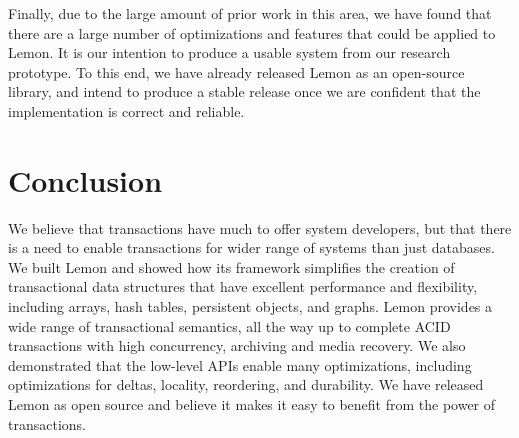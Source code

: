 \documentclass[10pt,letterpaper,twocolumn,english]{article}
\newcommand{\yad}{Lemon\xspace}
\begin{document}


Finally, due to the large amount of prior work in this area, we have
found that there are a large number of optimizations and features that
could be applied to \yad.  It is our intention to produce a usable
system from our research prototype.  To this end, we have already
released \yad as an open-source library, and intend to produce a
stable release once we are confident that the implementation is correct
and reliable.  


\section{Conclusion}

We believe that transactions have much to offer system developers, but
that there is a need to enable transactions for wider range of systems
than just databases.  We built \yad and showed how its framework
simplifies the creation of transactional data structures that have
excellent performance and flexibility, including arrays, hash tables,
persistent objects, and graphs.  \yad provides a wide range of
transactional semantics, all the way up to complete ACID transactions with
high concurrency, archiving and media recovery.  We also demonstrated
that the low-level APIs enable many optimizations, including
optimizations for deltas, locality, reordering, and durability.  We
have released \yad as open source and believe it makes it easy to
benefit from the power of transactions.

\end{document}
